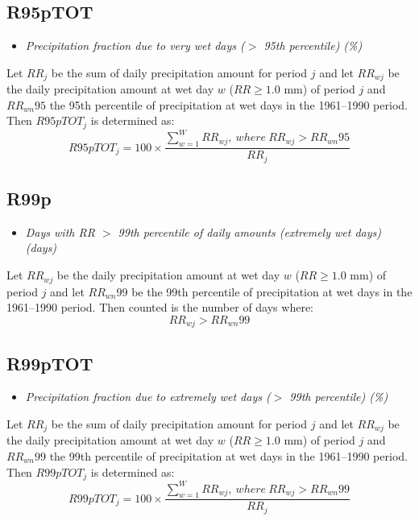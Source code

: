 \documentclass[a4paper,11pt]{article}
\begin{document}
\subsection*{R95pTOT}
\begin{itemize}
\item \textit{Precipitation fraction due to very wet days ($>$ 95th
percentile) (\%)}
\end{itemize}
Let $RR_{j}$ be the sum of daily precipitation amount for period $j$
and let $RR_{wj}$ be the daily precipitation amount at wet day $w$
($RR\geq1.0$ mm) of period $j$ and $RR_{wn}95$ the 95th percentile of
precipitation at wet days in the 1961--1990 period. Then $R95pTOT_{j}$
is determined as:
\begin{equation*}
R95pTOT_{j} = 100 \times \frac{\sum_{w=1}^{W}RR_{wj},\:where\:
RR_{wj}>RR_{wn}95}{RR_{j}}
\end{equation*}

\subsection*{R99p}
\begin{itemize}
\item \textit{Days with RR $>$ 99th percentile of daily amounts
(extremely wet days) (days)}
\end{itemize}
Let $RR_{wj}$ be the daily precipitation amount at wet day $w$
($RR\geq1.0$ mm) of period $j$ and let $RR_{wn}99$ be the 99th
percentile of precipitation at wet days in the 1961--1990 period. Then
counted is the number of days where:
\begin{equation*}
RR_{wj} > RR_{wn}99
\end{equation*}

\subsection*{R99pTOT}
\begin{itemize}
\item \textit{Precipitation fraction due to extremely wet days ($>$
99th percentile) (\%)}
\end{itemize}
Let $RR_{j}$ be the sum of daily precipitation amount for period $j$
and let $RR_{wj}$ be the daily precipitation amount at wet day $w$
($RR\geq1.0$ mm) of period $j$ and $RR_{wn}99$ the 99th percentile of
precipitation at wet days in the 1961--1990 period. Then $R99pTOT_{j}$
is determined as:
\begin{equation*}
R99pTOT_{j} = 100 \times \frac{\sum_{w=1}^{W}RR_{wj},\:where\:
RR_{wj}>RR_{wn}99}{RR_{j}}
\end{equation*}
\end{document}
